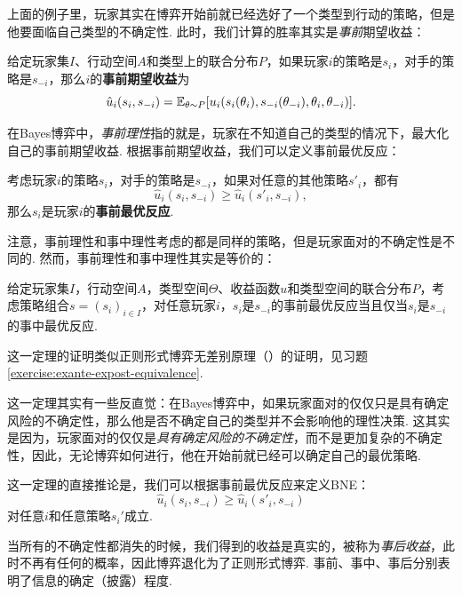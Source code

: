 上面的例子里，玩家其实在博弈开始前就已经选好了一个类型到行动的策略，但是他要面临自己类型的不确定性. 此时，我们计算的胜率其实是\textit{事前}期望收益：

\begin{definition}[事前期望收益]
    给定玩家集$I$、行动空间$A$和类型上的联合分布$P$，如果玩家$i$的策略是$s_i$，对手的策略是$s_{-i}$，那么$i$的\textbf{事前期望收益}为
\[\hat u_i(s_i,s_{-i})=\mathbb{E}_{\theta\sim P}[u_i(s_i(\theta_i),s_{-i}(\theta_{-i}),\theta_i,\theta_{-i})].\]
\end{definition}

在Bayes博弈中，\textit{事前理性}指的就是，玩家在不知道自己的类型的情况下，最大化自己的事前期望收益. 根据事前期望收益，我们可以定义事前最优反应：

\begin{definition}[事前最优反应]
    考虑玩家$i$的策略$s_i$，对手的策略是$s_{-i}$，如果对任意的其他策略$s'_i$，都有
    \[\hat u_i(s_i,s_{-i})\geq \hat u_i(s'_i,s_{-i}),\]
    那么$s_i$是玩家$i$的\textbf{事前最优反应}.
\end{definition}

注意，事前理性和事中理性考虑的都是同样的策略，但是玩家面对的不确定性是不同的. 然而，事前理性和事中理性其实是等价的：

\begin{theorem}\label{theorem:exante-expost-equivalence}
    给定玩家集$I，$行动空间$A$，类型空间$\Theta$、收益函数$u$和类型空间的联合分布$P$，考虑策略组合$s=(s_i)_{i\in I}$，对任意玩家$i$，$s_i$是$s_{-i}$的事前最优反应当且仅当$s_i$是$s_{-i}$的事中最优反应.
\end{theorem}

这一定理的证明类似正则形式博弈无差别原理（）的证明，见习题 \ref{exercise:exante-expost-equivalence}.

这一定理其实有一些反直觉：在Bayes博弈中，如果玩家面对的仅仅只是具有确定风险的不确定性，那么他是否不确定自己的类型并不会影响他的理性决策. 这其实是因为，玩家面对的仅仅是\textit{具有确定风险的不确定性}，而不是更加复杂的不确定性，因此，无论博弈如何进行，他在开始前就已经可以确定自己的最优策略.

这一定理的直接推论是，我们可以根据事前最优反应来定义BNE：
     \[\hat u_i(s_i,s_{-i})\geq \hat u_i(s'_i,s_{-i})\]
对任意$i$和任意策略$s_i'$成立.

当所有的不确定性都消失的时候，我们得到的收益是真实的，被称为\textit{事后收益}，此时不再有任何的概率，因此博弈退化为了正则形式博弈. 事前、事中、事后分别表明了信息的确定（披露）程度. 


